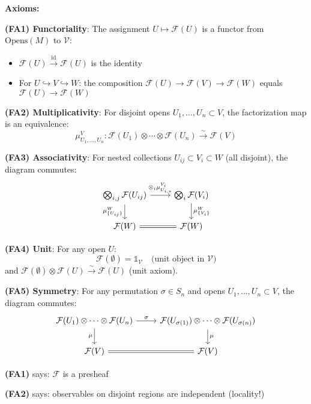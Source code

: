 \begin{example}
\begin{definition}
\textbf{Axioms:}

\textbf{(FA1) Functoriality}: The assignment $U \mapsto \mathcal{F}(U)$ is a functor 
from $\text{Opens}(M)$ to $\mathcal{V}$:
\begin{itemize}
\item $\mathcal{F}(U) \xrightarrow{\text{id}} \mathcal{F}(U)$ is the identity
\item For $U \hookrightarrow V \hookrightarrow W$: the composition 
   $\mathcal{F}(U) \to \mathcal{F}(V) \to \mathcal{F}(W)$ equals 
   $\mathcal{F}(U) \to \mathcal{F}(W)$
\end{itemize}

\textbf{(FA2) Multiplicativity}: For disjoint opens $U_1, \ldots, U_n \subset V$, 
the factorization map is an equivalence:
$$\mu_{U_1,\ldots,U_n}^V: \mathcal{F}(U_1) \otimes \cdots \otimes \mathcal{F}(U_n) 
   \xrightarrow{\sim} \mathcal{F}(V)$$

\textbf{(FA3) Associativity}: For nested collections 
$U_{ij} \subset V_i \subset W$ (all disjoint), the diagram commutes:
$$\begin{tikzcd}
\bigotimes_{i,j} \mathcal{F}(U_{ij}) 
   \arrow[r, "\otimes_i \mu_{U_{i,*}}^{V_i}"] 
   \arrow[d, "\mu_{\{U_{ij}\}}^W"'] &
\bigotimes_i \mathcal{F}(V_i) 
   \arrow[d, "\mu_{\{V_i\}}^W"] \\
\mathcal{F}(W) \arrow[r, equal] & \mathcal{F}(W)
\end{tikzcd}$$

\textbf{(FA4) Unit}: For any open $U$:
$$\mathcal{F}(\emptyset) = \mathbb{1}_{\mathcal{V}} 
   \quad \text{(unit object in } \mathcal{V}\text{)}$$
and $\mathcal{F}(\emptyset) \otimes \mathcal{F}(U) \xrightarrow{\sim} \mathcal{F}(U)$ 
(unit axiom).

\textbf{(FA5) Symmetry}: For any permutation $\sigma \in S_n$ and opens 
$U_1, \ldots, U_n \subset V$, the diagram commutes:
$$\begin{tikzcd}
\mathcal{F}(U_1) \otimes \cdots \otimes \mathcal{F}(U_n) 
   \arrow[r, "\sigma"] \arrow[d, "\mu"'] &
\mathcal{F}(U_{\sigma(1)}) \otimes \cdots \otimes \mathcal{F}(U_{\sigma(n)}) 
   \arrow[d, "\mu"] \\
\mathcal{F}(V) \arrow[r, equal] & \mathcal{F}(V)
\end{tikzcd}$$
\end{definition}

\begin{remark}
\textbf{(FA1)} says: $\mathcal{F}$ is a presheaf

\textbf{(FA2)} says: observables on disjoint regions are independent (locality!)


\end{remark}
\end{example}

